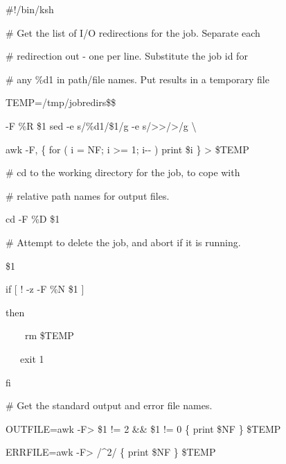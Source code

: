 \begin{exparasmall}

\#!/bin/ksh

\# Get the list of I/O redirections for the job. Separate each

\# redirection out - one per line. Substitute the job id for

\# any \%d1 in path/file names. Put results in a temporary file

\bigskip

TEMP=/tmp/jobredirs\$\$

\bigskip

\BtjlistName{} -F {\textquotedbl}\%R{\textquotedbl} \$1 {\textbar} sed -e
{\textquotedbl}s/\%d1/\$1/g{\textquotedbl} -e
{\textquotedbl}s/{\textgreater}{\textgreater}/{\textgreater}/g{\textquotedbl}
{\textbar}{\textbackslash}

awk -F, {\textquotesingle}\{ for ( i = NF; i {\textgreater}= 1; i-{}- )
print \$i \}{\textquotesingle} {\textgreater} \$TEMP

\bigskip

\# cd to the working directory for the job, to cope with

\# relative path names for output files.

\bigskip

cd {\textasciigrave}\BtjlistName{} -F {\textquotedbl}\%D{\textquotedbl}
\$1{\textasciigrave}

\bigskip

\# Attempt to delete the job, and abort if it is running.

\bigskip

\BtjdelName{} \$1

\bigskip

if [ ! -z {\textasciigrave}\BtjlistName{} -F {\textquotedbl}\%N{\textquotedbl}
\$1{\textasciigrave} ]

then

\ \ \ \ rm \$TEMP

\ \ \ exit 1

fi

\bigskip

\# Get the standard output and error file names.

\bigskip

OUTFILE={\textasciigrave}awk
-F{\textquotedbl}{\textgreater}{\textquotedbl} {\textquotesingle} \$1
!= 2 \&\& \$1 != 0 \{ print \$NF \}{\textquotesingle} \$TEMP
{\textasciigrave}

ERRFILE={\textasciigrave}awk
-F{\textquotedbl}{\textgreater}{\textquotedbl} {\textquotesingle}
/\^{}2/ \{ print \$NF \}{\textquotesingle} \$TEMP {\textasciigrave}


\end{exparasmall}
